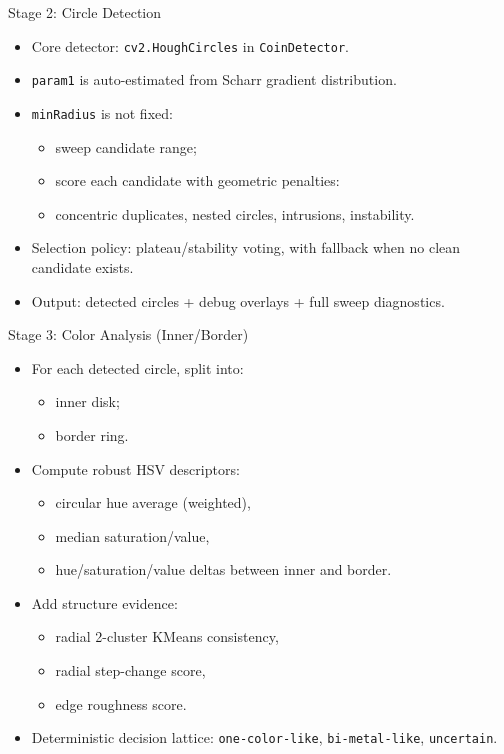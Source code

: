 \documentclass[aspectratio=169]{beamer}
\begin{document}
\begin{frame}{Stage 2: Circle Detection}
  \begin{itemize}
    \item Core detector: \texttt{cv2.HoughCircles} in \texttt{CoinDetector}.
    \item \texttt{param1} is auto-estimated from Scharr gradient distribution.
    \item \texttt{minRadius} is not fixed:
    \begin{itemize}
      \item sweep candidate range;
      \item score each candidate with geometric penalties:
      \item concentric duplicates, nested circles, intrusions, instability.
    \end{itemize}
    \item Selection policy: plateau/stability voting, with fallback when no clean candidate exists.
    \item Output: detected circles + debug overlays + full sweep diagnostics.
  \end{itemize}
\end{frame}

\begin{frame}{Stage 3: Color Analysis (Inner/Border)}
  \begin{itemize}
    \item For each detected circle, split into:
    \begin{itemize}
      \item inner disk;
      \item border ring.
    \end{itemize}
    \item Compute robust HSV descriptors:
    \begin{itemize}
      \item circular hue average (weighted),
      \item median saturation/value,
      \item hue/saturation/value deltas between inner and border.
    \end{itemize}
    \item Add structure evidence:
    \begin{itemize}
      \item radial 2-cluster KMeans consistency,
      \item radial step-change score,
      \item edge roughness score.
    \end{itemize}
    \item Deterministic decision lattice: \texttt{one-color-like}, \texttt{bi-metal-like}, \texttt{uncertain}.
  \end{itemize}
\end{frame}
\end{document}
